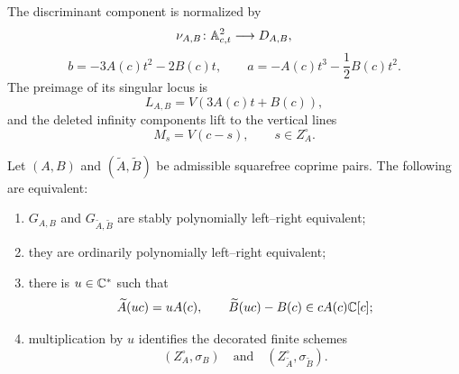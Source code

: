 The discriminant component is normalized by
\[
\nu_{A,B}\colon\mathbb A^2_{c,t}\longrightarrow D_{A,B},
\]
\[
b=-3A(c)t^2-2B(c)t,\qquad
a=-A(c)t^3-\frac12B(c)t^2.
\]
The preimage of its singular locus is
\[
L_{A,B}=V(3A(c)t+B(c)),
\]
and the deleted infinity components lift to the vertical lines
\[
M_s=V(c-s),\qquad s\in Z_A^\circ.
\]

\begin{theorem}
\label{thm:general-boundary-torelli}
Let \((A,B)\) and \((\widetilde A,\widetilde B)\) be admissible squarefree
coprime pairs.  The following are equivalent:
\begin{enumerate}[label=(\roman*)]
\item \(G_{A,B}\) and \(G_{\widetilde A,\widetilde B}\) are stably
polynomially left--right equivalent;
\item they are ordinarily polynomially left--right equivalent;
\item there is \(u\in\mathbb C^*\) such that
\[
\widetilde A(uc)=uA(c),\qquad
\widetilde B(uc)-B(c)\in cA(c)\mathbb C[c];
\]
\item multiplication by \(u\) identifies the decorated finite schemes
\[
(Z_A^\circ,\sigma_B)
\quad\text{and}\quad
(Z_{\widetilde A}^\circ,\sigma_{\widetilde B}).
\]
\end{enumerate}
\end{theorem}

